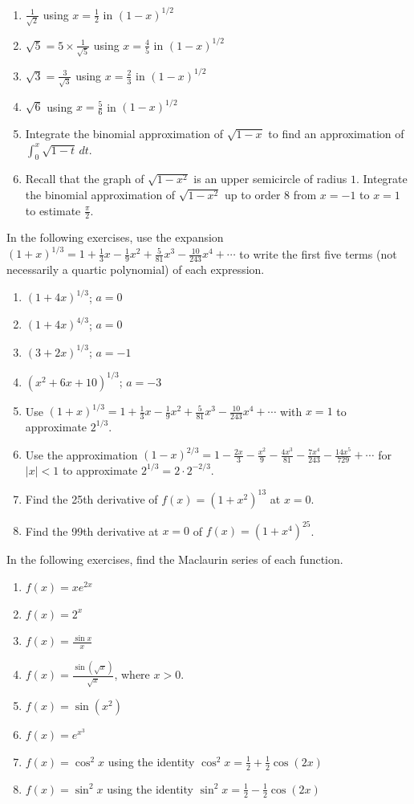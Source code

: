 \documentclass{exercises}
\begin{document}
\begin{enumerate}[resume]
\item \techrequired $\frac{1}{\sqrt{2}}$ using $x=\frac{1}{2}$ in ${(1-x)}^{1/2}$
\item \techrequired $\sqrt{5}=5\times \frac{1}{\sqrt{5}}$ using $x=\frac{4}{5}$ in ${(1-x)}^{1/2}$
\item \techrequired $\sqrt{3}=\frac{3}{\sqrt{3}}$ using $x=\frac{2}{3}$ in ${(1-x)}^{1/2}$
\item \techrequired $\sqrt{6}$ using $x=\frac{5}{6}$ in ${(1-x)}^{1/2}$
\item Integrate the binomial approximation of $\sqrt{1-x}$ to find an approximation of $\int_{0}^{x}\sqrt{1-t}\,dt$.
\item \techrequired Recall that the graph of $\sqrt{1-x^{2}}$ is an upper semicircle of radius $1$. Integrate the binomial approximation of $\sqrt{1-x^{2}}$ up to order $8$ from $x=-1$ to $x=1$ to estimate $\frac{\pi}{2}$.
\end{enumerate}

In the following exercises, use the expansion ${(1+x)}^{1/3}=1+\frac{1}{3}x-\frac{1}{9}x^{2}+\frac{5}{81}x^{3}-\frac{10}{243}x^{4}+\cdots$ to write the first five terms (not necessarily a quartic polynomial) of each expression.

\begin{enumerate}[resume]
\item ${(1+4x)}^{1/3}$; $a=0$
\item ${(1+4x)}^{4/3}$; $a=0$
\item ${(3+2x)}^{1/3}$; $a=-1$
\item ${(x^{2}+6x+10)}^{1/3}$; $a=-3$
\item Use ${(1+x)}^{1/3}=1+\frac{1}{3}x-\frac{1}{9}x^{2}+\frac{5}{81}x^{3}-\frac{10}{243}x^{4}+\cdots$ with $x=1$ to approximate $2^{1/3}$.
\item Use the approximation ${(1-x)}^{2/3}=1-\frac{2x}{3}-\frac{x^{2}}{9}-\frac{4x^{3}}{81}-\frac{7x^{4}}{243}-\frac{14x^{5}}{729}+\cdots$ for $|x|<1$ to approximate $2^{1/3}=2\cdot 2^{-2/3}$.
\item Find the 25th derivative of $f(x)={(1+x^{2})}^{13}$ at $x=0$.
\item Find the 99th derivative at $x=0$ of $f(x)={(1+x^{4})}^{25}$.
\end{enumerate}

In the following exercises, find the Maclaurin series of each function.

\begin{enumerate}[resume]
\item $f(x)=xe^{2x}$
\item $f(x)=2^{x}$
\item $f(x)=\frac{\sin x}{x}$
\item $f(x)=\frac{\sin(\sqrt{x})}{\sqrt{x}}$, where $x>0$.
\item $f(x)=\sin(x^{2})$
\item $f(x)=e^{x^{3}}$
\item $f(x)=\cos^{2}x$ using the identity $\cos^{2}x=\frac{1}{2}+\frac{1}{2}\cos (2x)$
\item $f(x)=\sin^{2}x$ using the identity $\sin^{2}x=\frac{1}{2}-\frac{1}{2}\cos (2x)$
\end{enumerate}
\end{document}
